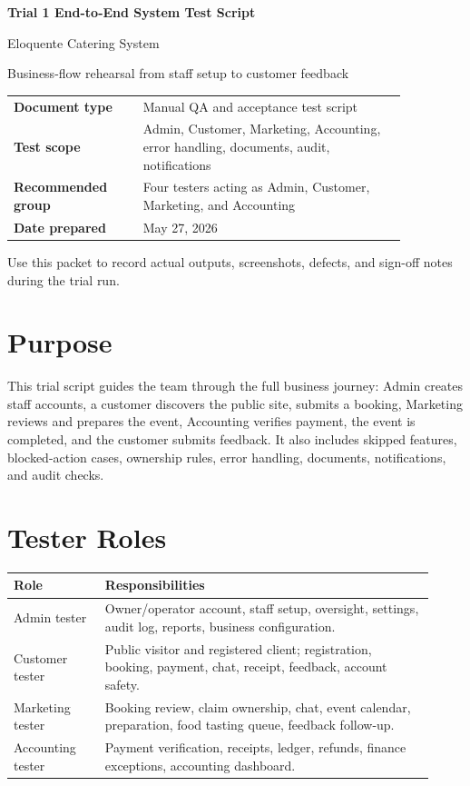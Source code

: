 \documentclass[11pt,a4paper]{article}
\begin{document}
\begin{titlepage}
  \centering
  \vspace*{1.5cm}
  {\Huge\bfseries\color{eloMaroon} Trial 1 End-to-End System Test Script\par}
  \vspace{0.5cm}
  {\Large Eloquente Catering System\par}
  \vspace{1cm}
  {\large Business-flow rehearsal from staff setup to customer feedback\par}
  \vfill
  \begin{tabular}{>{\bfseries}p{0.28\linewidth}p{0.58\linewidth}}
    Document type & Manual QA and acceptance test script \\
    Test scope & Admin, Customer, Marketing, Accounting, error handling, documents, audit, notifications \\
    Recommended group & Four testers acting as Admin, Customer, Marketing, and Accounting \\
    Date prepared & May 27, 2026 \\
  \end{tabular}
  \vfill
  {\color{eloMuted} Use this packet to record actual outputs, screenshots, defects, and sign-off notes during the trial run.}
\end{titlepage}

\tableofcontents
\newpage

\section{Purpose}
This trial script guides the team through the full business journey: Admin creates staff accounts, a customer discovers the public site, submits a booking, Marketing reviews and prepares the event, Accounting verifies payment, the event is completed, and the customer submits feedback. It also includes skipped features, blocked-action cases, ownership rules, error handling, documents, notifications, and audit checks.

\section{Tester Roles}
\begin{longtable}{p{0.2\linewidth}p{0.72\linewidth}}
\toprule
\textbf{Role} & \textbf{Responsibilities} \\
\midrule
Admin tester & Owner/operator account, staff setup, oversight, settings, audit log, reports, business configuration. \\
Customer tester & Public visitor and registered client; registration, booking, payment, chat, receipt, feedback, account safety. \\
Marketing tester & Booking review, claim ownership, chat, event calendar, preparation, food tasting queue, feedback follow-up. \\
Accounting tester & Payment verification, receipts, ledger, refunds, finance exceptions, accounting dashboard. \\
\bottomrule
\end{longtable}
\end{document}
